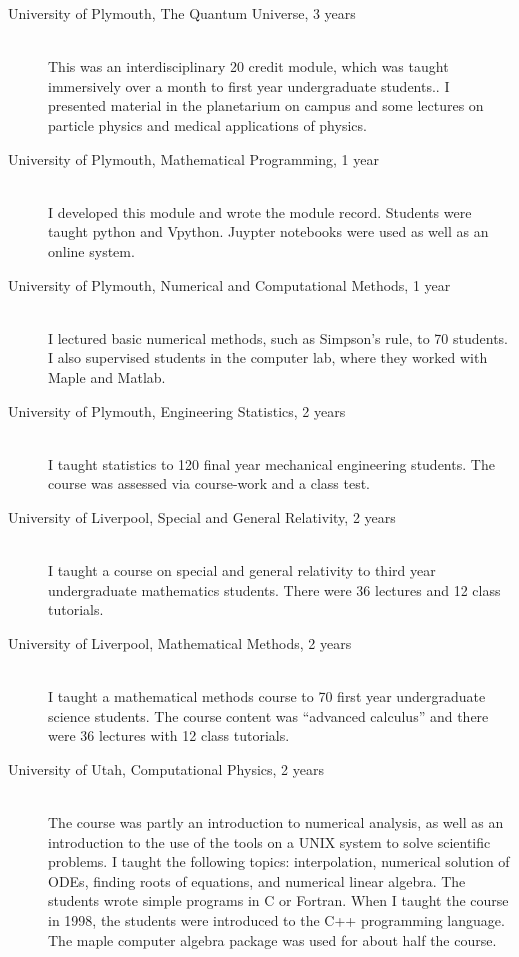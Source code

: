 \documentclass[12pt]{article}
\begin{document}
\begin{description}
  \item[University of Plymouth, The Quantum Universe,
3 years] \hfill \\
This was an interdisciplinary 20 credit module, which was taught
immersively over a month to first year undergraduate students.. 
I presented material in the planetarium on campus and some lectures on
particle physics and medical applications of physics.

  \item[University of Plymouth, Mathematical Programming,
1 year] \hfill \\
I developed this module and wrote the module record. Students
were taught python and Vpython. Juypter notebooks were used as well
as an online system.

  \item[University of Plymouth, Numerical and Computational Methods,
1 year] \hfill \\
I lectured basic numerical methods,
such as Simpson's rule,
 to 70 students. I also supervised
students in the computer lab, where they worked with Maple
and Matlab.

  \item[University of Plymouth, Engineering Statistics,
2 years] \hfill \\
I taught statistics to 120 final year mechanical engineering 
students. The course was assessed via course-work and a class 
test.

  \item[University of Liverpool, Special and General
Relativity,
2 years] \hfill \\
I taught a course on special and general
relativity to third year undergraduate mathematics students. 
There were 36 lectures and 12 class tutorials.

  \item[University of Liverpool, Mathematical Methods, 2 years] \hfill \\
I taught a mathematical methods course
 to 70 first year undergraduate science students.  The course
content was ``advanced calculus'' and there were 36 lectures 
with 12 class tutorials.


\item[University of Utah, Computational Physics, 2 years] \hfill \\
The course was partly an introduction to numerical
analysis, as well as an introduction to the use of the tools on a UNIX
system to solve scientific problems.  I taught the following topics:
interpolation, numerical solution of ODEs, finding roots of
equations, and numerical linear algebra.  The students wrote simple
programs in C or Fortran. When I taught the course in 1998, the
students were introduced to the C++ programming language. The maple
computer algebra package was used for about half the course.


\end{description}
\end{document}
